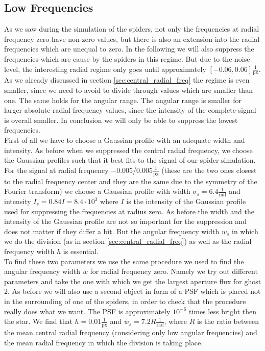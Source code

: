 \subsection{Low Frequencies}
As we saw during the simulation of the spiders, not only the frequencies at radial frequency zero have non-zero values, but there is also an extension into the radial frequencies which are unequal to zero. In the following we will also suppress the frequencies which are cause by the spiders in this regime. But due to the noise level, the interesting radial regime only goes until approximately $[-0.06, 0.06] \frac{1}{\mathrm{px}}$. As we already discussed in section \ref{sec:central_radial_freq} the regime is even smaller, since we need to avoid to divide through values which are smaller than one. The same holds for the angular range. The angular range is smaller for larger absolute radial frequency values, since the intensity of the complete signal is overall smaller. In conclusion we will only be able to suppress the lowest frequencies.\\
First of all we have to choose a Gaussian profile with an adequate width and intensity. As before when we suppressed the central radial frequency, we choose the Gaussian profiles such that it best fits to the signal of our spider simulation. For the signal at radial frequency $-0.005$/$0.005 \frac{1}{\mathrm{px}}$ (these are the two ones closest to the radial frequency center and they are the same due to the symmetry of the Fourier transform) we choose a Gaussian profile with width $\sigma_s = 6.4 \frac{1}{\mathrm{rad}}$ and intensity $I_s = 0.84 I = 8.4 \cdot 10^3$ where $I$ is the intensity of the Gaussian profile used for suppressing the frequencies at radius zero. As before the width and the intensity of the Gaussian profile are not so important for the suppression and does not matter if they differ a bit. But the angular frequency width $w_s$ in which we do the division (as in section \ref{sec:central_radial_freq}) as well as the radial frequency width $h$ is essential.\\
To find these two parameters we use the same procedure we used to find the angular frequency width $w$ for radial frequency zero. Namely we try out different parameters and take the one with which we get the largest aperture flux for ghost 2. As before we will also use a second object in form of a PSF which is placed not in the surrounding of one of the spiders, in order to check that the procedure really does what we want. The PSF is approximately $10^{-6}$ times less bright then the star. We find that $h = 0.01 \frac{1}{\mathrm{px}}$ and $w_s = 7.2 R \frac{1}{\mathrm{rad}}$, where $R$ is the ratio between the mean central radial frequency (considering only low angular frequencies) and the mean radial frequency in which the division is taking place.\\

